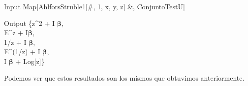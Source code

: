 \begin{mmaCell}{Input}
	 Map[AhlforsStruble1[#, 1, {x, y, z}] &, ConjuntoTestU]
\end{mmaCell}
\begin{mmaCell}{Output}
	 \{z^2 + I \(\pmb{\beta}\),\\ E^z + I\(\pmb{\beta}\),\\ 1/z + I \(\pmb{\beta}\),\\ E^(1/z) + I \(\pmb{\beta}\),\\ I \(\pmb{\beta}\) + Log[z]\}
\end{mmaCell}
\noindent Podemos ver que estos resultados son los mismos que obtuvimos anteriormente.



















